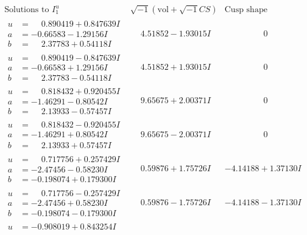 \documentclass[1p]{elsarticle_modified}
\theoremstyle{definition}
\newcommand{\I}{\sqrt{-1}}
\begin{document}
$$\begin{array}{c|c|c}
\text{Solutions to }I^u_{1}& \I (\text{vol} + \sqrt{-1}CS) & \text{Cusp shape}\\
 \hline 
\begin{aligned}
u &= \phantom{-}0.890419 + 0.847639 I \\
a &= -0.66583 - 1.29156 I \\
b &= \phantom{-}2.37783 + 0.54118 I\end{aligned}
 & \phantom{-}4.51852 - 1.93015 I & \phantom{-0.000000 } 0 \\ \hline\begin{aligned}
u &= \phantom{-}0.890419 - 0.847639 I \\
a &= -0.66583 + 1.29156 I \\
b &= \phantom{-}2.37783 - 0.54118 I\end{aligned}
 & \phantom{-}4.51852 + 1.93015 I & \phantom{-0.000000 } 0 \\ \hline\begin{aligned}
u &= \phantom{-}0.818432 + 0.920455 I \\
a &= -1.46291 - 0.80542 I \\
b &= \phantom{-}2.13933 - 0.57457 I\end{aligned}
 & \phantom{-}9.65675 + 2.00371 I & \phantom{-0.000000 } 0 \\ \hline\begin{aligned}
u &= \phantom{-}0.818432 - 0.920455 I \\
a &= -1.46291 + 0.80542 I \\
b &= \phantom{-}2.13933 + 0.57457 I\end{aligned}
 & \phantom{-}9.65675 - 2.00371 I & \phantom{-0.000000 } 0 \\ \hline\begin{aligned}
u &= \phantom{-}0.717756 + 0.257429 I \\
a &= -2.47456 - 0.58230 I \\
b &= -0.198074 + 0.179300 I\end{aligned}
 & \phantom{-}0.59876 + 1.75726 I & -4.14188 + 1.37130 I \\ \hline\begin{aligned}
u &= \phantom{-}0.717756 - 0.257429 I \\
a &= -2.47456 + 0.58230 I \\
b &= -0.198074 - 0.179300 I\end{aligned}
 & \phantom{-}0.59876 - 1.75726 I & -4.14188 - 1.37130 I \\ \hline\begin{aligned}
u &= -0.908019 + 0.843254 I \\

\end{aligned}
\end{array}$$
\end{document}
